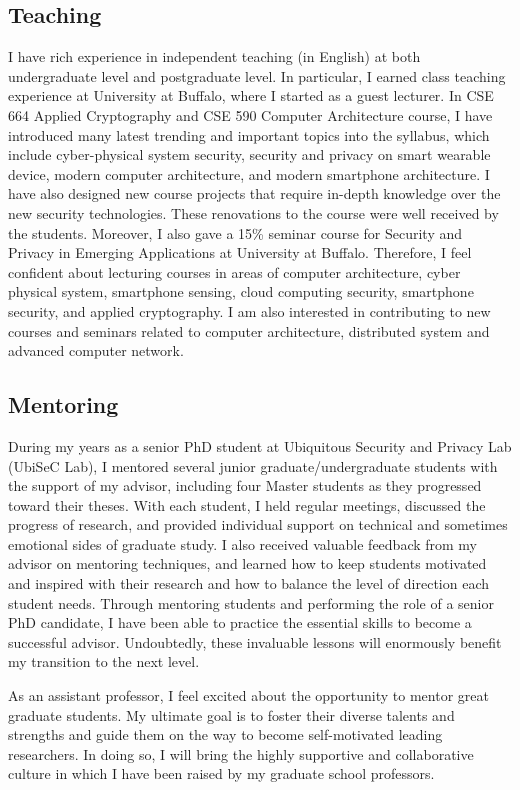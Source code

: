 \documentclass[11pt]{article}
\begin{document}
\subsection*{Teaching} 
 I have rich experience in independent teaching (in English) at both undergraduate level and postgraduate level. In particular, I earned class teaching experience at University at Buffalo, where I started as a guest lecturer. In CSE 664 Applied Cryptography and CSE 590 Computer Architecture course, I have introduced many latest trending and important topics into the syllabus, which include cyber-physical system security, security and privacy on smart wearable device, modern computer architecture, and modern smartphone architecture. I have also designed new course projects that require in-depth knowledge over the new security technologies. These renovations to the course were well received by the students. Moreover, I also gave a 15\% seminar course for Security and Privacy in Emerging Applications at University at Buffalo. Therefore, I feel confident about lecturing courses in areas of computer architecture, cyber physical system, smartphone sensing, cloud computing security, smartphone security, and applied cryptography. I am also interested in contributing to new courses and seminars related to computer architecture, distributed system and advanced computer network. 
\subsection*{Mentoring}
 During my years as a senior PhD student at Ubiquitous Security and Privacy Lab (UbiSeC Lab), I mentored several junior graduate/undergraduate students with the support of my advisor, including four Master students as they progressed toward their theses. With each student, I held regular meetings, discussed the progress of research, and provided individual support on technical and sometimes emotional sides of graduate study. I also received valuable feedback from my advisor on mentoring techniques, and learned how to keep students motivated and inspired with their research and how to balance the level of direction each student needs. Through mentoring students and performing the role of a senior PhD candidate, I have been able to practice the essential skills to become a successful advisor. Undoubtedly, these invaluable lessons will enormously benefit my transition to the next level. 

As an assistant professor, I feel excited about the opportunity to mentor great graduate students. My ultimate goal is to foster their diverse talents and strengths and guide them on the way to become self-motivated leading researchers. In doing so, I will bring the highly supportive and collaborative culture in which I have been raised by my graduate school professors.
\end{document}
